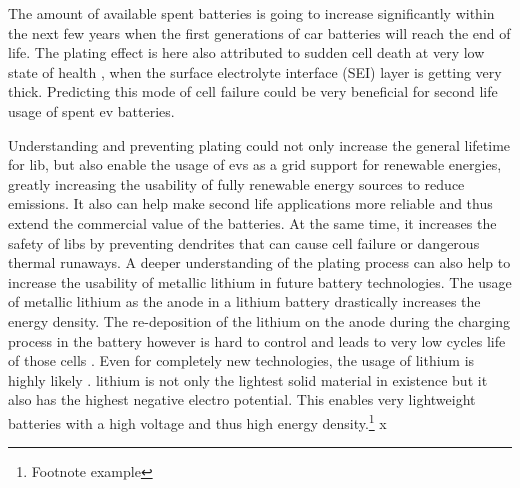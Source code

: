The amount of available spent batteries is going to increase significantly within the next few years when the first generations of car batteries will reach the end of life. The plating effect is here also attributed to sudden cell death at very low state of health \cite{Waldmann.2018}, when the surface electrolyte interface (SEI) layer is getting very thick. Predicting this mode of cell failure could be very beneficial for second life usage of spent \gls{ev} batteries. \par
Understanding and preventing plating could not only increase the general lifetime for \gls{lib}, but also enable the usage of \gls{ev}s as a grid support for renewable energies, greatly increasing the usability of fully renewable energy sources to reduce  emissions. It also can help make second life applications more reliable and thus extend the commercial value of the batteries. At the same time, it increases the safety of \gls{lib}s by preventing dendrites that can cause cell failure or dangerous thermal runaways.
A deeper understanding of the plating process can also help to increase the usability of metallic lithium in future battery technologies. The usage of metallic lithium as the anode in a lithium battery drastically increases the energy density. The re-deposition of the lithium on the anode during the charging process in the battery however is hard to control and leads to very low cycles life of those cells \cite{Lin.2017,Cheng.2017}. Even for completely new technologies, the usage of lithium is highly likely \cite{Placke.2017}. lithium is not only the lightest solid material in existence but it also has the highest negative electro potential. This enables very lightweight batteries with a high voltage and thus high energy density.\footnote{Footnote example} \gls{x}
